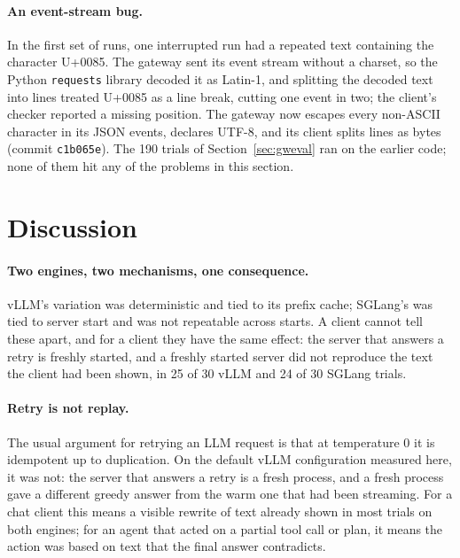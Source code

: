 \documentclass[10pt,twocolumn]{article}
\begin{document}
\paragraph{An event-stream bug.} In the first set of runs, one interrupted run
had a repeated text containing the character U+0085. The gateway sent its
event stream without a charset, so the Python \texttt{requests} library
decoded it as Latin-1, and splitting the decoded text into lines treated
U+0085 as a line break, cutting one event in two; the client's checker
reported a missing position. The gateway now escapes every non-ASCII
character in its JSON events, declares UTF-8, and its client splits lines as
bytes (commit \texttt{c1b065e}). The 190 trials of Section~\ref{sec:gweval}
ran on the earlier code; none of them hit any of the problems in this
section.

\section{Discussion}

\paragraph{Two engines, two mechanisms, one consequence.} vLLM's variation
was deterministic and tied to its prefix cache; SGLang's was tied to server
start and was not repeatable across starts. A client cannot tell these
apart, and for a client they have the same effect: the server that answers
a retry is freshly started, and a freshly started server did not reproduce
the text the client had been shown, in 25 of 30 vLLM and 24 of 30 SGLang
trials.

\paragraph{Retry is not replay.} The usual argument for retrying an LLM
request is that at temperature 0 it is idempotent up to duplication. On the
default vLLM configuration measured here, it was not: the server that
answers a retry is a fresh process, and a fresh process gave a different
greedy answer from the warm one that had been streaming. For a chat client
this means a visible rewrite of text already shown in most trials on both
engines; for an
agent that acted on a partial tool call or plan, it means the action was
based on text that the final answer contradicts.
\end{document}
